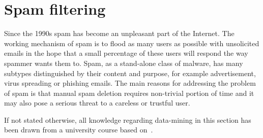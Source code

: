 \documentclass[english,cover]{fitthesis} %
\begin{document}

\clearpage
\section{Spam filtering}
Since the 1990s spam has become an unpleasant part of the Internet. The working mechanism of spam is to flood as many users as possible with unsolicited emails in the hope that a small percentage of these users will respond the way spammer wants them to. Spam, as a stand-alone class of malware, has many subtypes distinguished by their content and purpose, for example advertisement, virus spreading or phishing emails. The main reasons for addressing the problem of spam is that manual spam deletion requires non-trivial portion of time and it may also pose a serious threat to a careless or trustful user.

If not stated otherwise, all knowledge regarding data-mining in this section has been drawn from a university course based on~\cite{han_datamining}.
\end{document}

